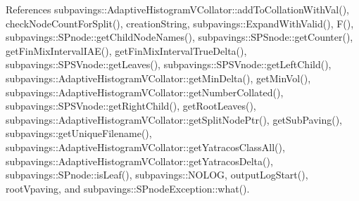 \-References subpavings\-::\-Adaptive\-Histogram\-V\-Collator\-::add\-To\-Collation\-With\-Val(), check\-Node\-Count\-For\-Split(), creation\-String, subpavings\-::\-Expand\-With\-Valid(), \-F(), subpavings\-::\-S\-Pnode\-::get\-Child\-Node\-Names(), subpavings\-::\-S\-P\-Snode\-::get\-Counter(), get\-Fin\-Mix\-Interval\-I\-A\-E(), get\-Fin\-Mix\-Interval\-True\-Delta(), subpavings\-::\-S\-P\-S\-Vnode\-::get\-Leaves(), subpavings\-::\-S\-P\-S\-Vnode\-::get\-Left\-Child(), subpavings\-::\-Adaptive\-Histogram\-V\-Collator\-::get\-Min\-Delta(), get\-Min\-Vol(), subpavings\-::\-Adaptive\-Histogram\-V\-Collator\-::get\-Number\-Collated(), subpavings\-::\-S\-P\-S\-Vnode\-::get\-Right\-Child(), get\-Root\-Leaves(), subpavings\-::\-Adaptive\-Histogram\-V\-Collator\-::get\-Split\-Node\-Ptr(), get\-Sub\-Paving(), subpavings\-::get\-Unique\-Filename(), subpavings\-::\-Adaptive\-Histogram\-V\-Collator\-::get\-Yatracos\-Class\-All(), subpavings\-::\-Adaptive\-Histogram\-V\-Collator\-::get\-Yatracos\-Delta(), subpavings\-::\-S\-Pnode\-::is\-Leaf(), subpavings\-::\-N\-O\-L\-O\-G, output\-Log\-Start(), root\-Vpaving, and subpavings\-::\-S\-Pnode\-Exception\-::what().


